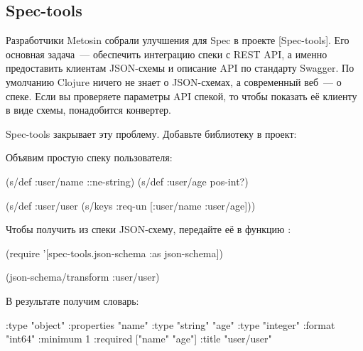 
\subsection{Spec-tools}

Разработчики Metosin собрали улучшения для Spec в проекте
[Spec-tools]. Его
основная задача~--- обеспечить интеграцию спеки с REST API, а именно
предоставить клиентам JSON-схемы и описание API по стандарту Swagger. По
умолчанию Clojure ничего не знает о JSON-схемах, а современный веб~--- о
спеке. Если вы проверяете параметры API спекой, то чтобы показать её клиенту в
виде схемы, понадобится конвертер.

Spec-tools закрывает эту проблему. Добавьте библиотеку в проект:


\begin{clojure}
\end{clojure}


Объявим простую спеку пользователя:

\iflarge\vspace{15mm}\pagebreak[4]\fi


\begin{clojure}
(s/def :user/name ::ne-string)
(s/def :user/age pos-int?)

(s/def :user/user
  (s/keys :req-un [:user/name :user/age]))
\end{clojure}


Чтобы получить из спеки JSON-схему, передайте её в функцию :


\begin{clojure}
(require '[spec-tools.json-schema
           :as json-schema])

(json-schema/transform :user/user)
\end{clojure}


В результате получим словарь:

\ifafive\vspace{15mm}\pagebreak[4]\fi


\begin{clojure/lines}
{:type "object"
 :properties
 {"name" {:type "string"}
  "age" {:type "integer"
         :format "int64"
         :minimum 1}}
 :required ["name" "age"]
 :title "user/user"}
\end{clojure/lines}


